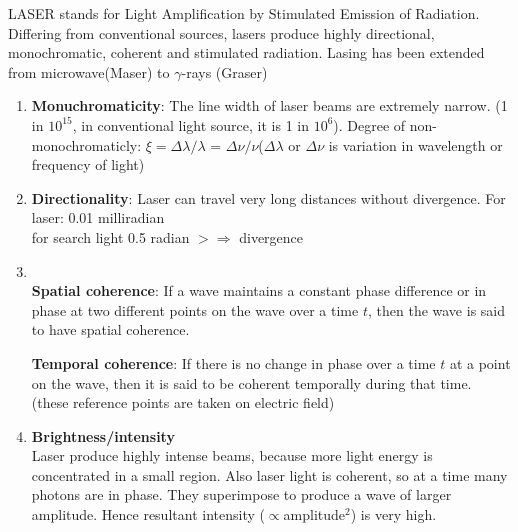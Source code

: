 LASER stands for Light Amplification by Stimulated Emission of Radiation. Differing from conventional sources, lasers produce highly
directional, monochromatic, coherent and stimulated radiation. Lasing has been extended from microwave(Maser) to $\gamma$-rays (Graser)


\begin{enumerate}
	\item \textbf{Monuchromaticity}: The line width of laser beams are extremely narrow. (1 in $10^{15}$, in conventional light source, it is 1 in $10^6$). Degree of non-monochromaticly: $\xi=\Delta\lambda/\lambda$ = $\Delta\nu/\nu$($\Delta\lambda\text{ or }\Delta\nu$ is variation in wavelength or frequency of light)
	\item \textbf{Directionality}: Laser can travel very long distances without divergence.
	      For laser: 0.01 milliradian\\
	      for search light 0.5 radian
	      $>\Rightarrow$ divergence
	\item {}\\[2pt]
	      \textbf{Spatial coherence}: If a wave maintains a constant phase difference or in phase at two different points on
	      the wave over a time $t$, then the wave is said to have spatial coherence.

	      \textbf{Temporal coherence}: If there is no change in phase over a time $t$ at a point on the wave, then it is said to be coherent temporally
	      during that time. (these reference points are taken on electric field)
	\item \textbf{Brightness/intensity}\\
	      Laser produce highly intense beams, because more light energy is concentrated in a small region. Also laser light is coherent, so at a time many photons are in phase. They superimpose to produce a wave of larger amplitude. Hence resultant intensity ($\propto$amplitude$^2$) is very high.
\end{enumerate}

\noparindent

